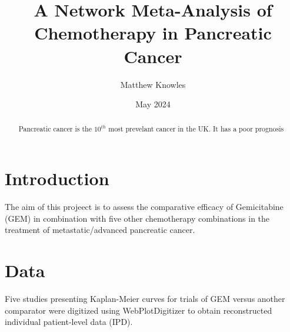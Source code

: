 \documentclass[11pt]{amsart}
\title{A Network Meta-Analysis of Chemotherapy in Pancreatic Cancer}
\date{May 2024}
\author{Matthew Knowles}
\begin{document}
\maketitle

\begin{abstract}
    Pancreatic cancer is the $10^{th}$ most prevelant cancer in the UK. It has a poor prognosis 
\end{abstract}

\section{Introduction}
The aim of this projeect is to assess the comparative efficacy of Gemicitabine (GEM) in combination with five other chemotherapy combinations in the treatment of metastatic/advanced pancreatic cancer.

\section{Data}
Five studies presenting Kaplan-Meier curves for trials of GEM versus another comparator were digitized using WebPlotDigitizer to obtain reconstructed individual patient-level data (IPD).
\end{document}
